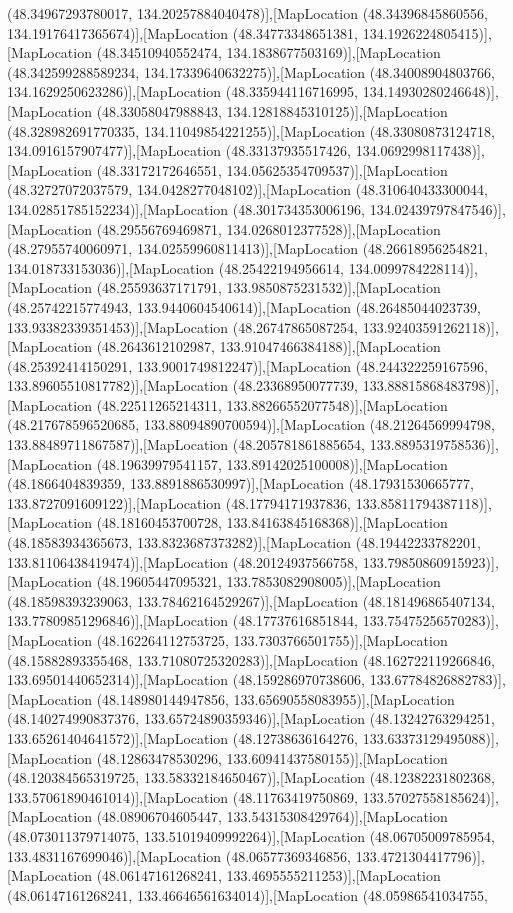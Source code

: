 (48.34967293780017, 134.20257884040478)],[MapLocation (48.34396845860556, 134.19176417365674)],[MapLocation (48.34773348651381, 134.1926224805415)],[MapLocation (48.34510940552474, 134.1838677503169)],[MapLocation (48.342599288589234, 134.17339640632275)],[MapLocation (48.34008904803766, 134.1629250623286)],[MapLocation (48.335944116716995, 134.14930280246648)],[MapLocation (48.33058047988843, 134.12818845310125)],[MapLocation (48.328982691770335, 134.11049854221255)],[MapLocation (48.33080873124718, 134.0916157907477)],[MapLocation (48.33137935517426, 134.0692998117438)],[MapLocation (48.33172172646551, 134.05625354709537)],[MapLocation (48.32727072037579, 134.0428277048102)],[MapLocation (48.310640433300044, 134.02851785152234)],[MapLocation (48.301734353006196, 134.02439797847546)],[MapLocation (48.29556769469871, 134.0268012377528)],[MapLocation (48.27955740060971, 134.02559960811413)],[MapLocation (48.26618956254821, 134.018733153036)],[MapLocation (48.25422194956614, 134.0099784228114)],[MapLocation (48.25593637171791, 133.9850875231532)],[MapLocation (48.25742215774943, 133.9440604540614)],[MapLocation (48.26485044023739, 133.93382339351453)],[MapLocation (48.26747865087254, 133.92403591262118)],[MapLocation (48.2643612102987, 133.91047466384188)],[MapLocation (48.25392414150291, 133.9001749812247)],[MapLocation (48.244322259167596, 133.89605510817782)],[MapLocation (48.23368950077739, 133.88815868483798)],[MapLocation (48.22511265214311, 133.88266552077548)],[MapLocation (48.217678596520685, 133.88094890700594)],[MapLocation (48.21264569994798, 133.88489711867587)],[MapLocation (48.205781861885654, 133.8895319758536)],[MapLocation (48.19639979541157, 133.89142025100008)],[MapLocation (48.1866404839359, 133.8891886530997)],[MapLocation (48.17931530665777, 133.8727091609122)],[MapLocation (48.17794171937836, 133.85811794387118)],[MapLocation (48.18160453700728, 133.84163845168368)],[MapLocation (48.18583934365673, 133.8323687373282)],[MapLocation (48.19442233782201, 133.81106438419474)],[MapLocation (48.20124937566758, 133.79850860915923)],[MapLocation (48.19605447095321, 133.7853082908005)],[MapLocation (48.18598393239063, 133.78462164529267)],[MapLocation (48.181496865407134, 133.77809851296846)],[MapLocation (48.17737616851844, 133.75475256570283)],[MapLocation (48.162264112753725, 133.7303766501755)],[MapLocation (48.15882893355468, 133.71080725320283)],[MapLocation (48.162722119266846, 133.69501440652314)],[MapLocation (48.159286970738606, 133.67784826882783)],[MapLocation (48.148980144947856, 133.65690558083955)],[MapLocation (48.140274990837376, 133.65724890359346)],[MapLocation (48.13242763294251, 133.65261404641572)],[MapLocation (48.12738636164276, 133.63373129495088)],[MapLocation (48.12863478530296, 133.60941437580155)],[MapLocation (48.120384565319725, 133.58332184650467)],[MapLocation (48.12382231802368, 133.57061890461014)],[MapLocation (48.11763419750869, 133.57027558185624)],[MapLocation (48.08906704605447, 133.54315308429764)],[MapLocation (48.073011379714075, 133.51019409992264)],[MapLocation (48.06705009785954, 133.4831167699046)],[MapLocation (48.06577369346856, 133.4721304417796)],[MapLocation (48.06147161268241, 133.4695555211253)],[MapLocation (48.06147161268241, 133.46646561634014)],[MapLocation (48.05986541034755, 